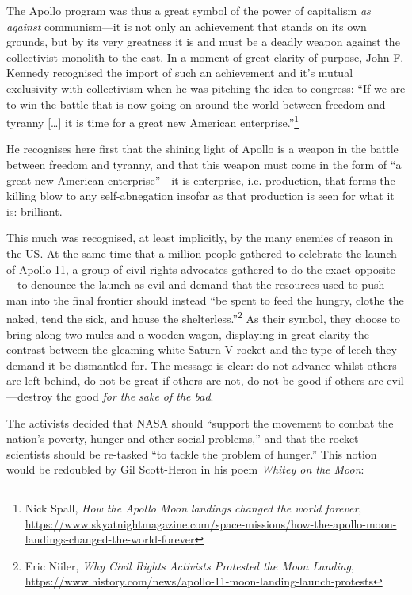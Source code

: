 \documentclass[11pt]{article}
\begin{document}
The Apollo program was thus a great symbol of the power of capitalism \emph{as against} communism---it is not only an achievement that stands on its own grounds, but by its very greatness it is and must be a deadly weapon against the collectivist monolith to the east. In a moment of great clarity of purpose, John F. Kennedy recognised the import of such an achievement and it's mutual exclusivity with collectivism when he was pitching the idea to congress: ``If we are to win the battle that is now going on around the world between freedom and tyranny [\ldots{}] it is time for a great new American enterprise.''\footnote{Nick Spall, \emph{How the Apollo Moon landings changed the world forever}, \url{https://www.skyatnightmagazine.com/space-missions/how-the-apollo-moon-landings-changed-the-world-forever}}

He recognises here first that the shining light of Apollo is a weapon in the battle between freedom and tyranny, and that this weapon must come in the form of ``a great new American enterprise''---it is enterprise, i.e. production, that forms the killing blow to any self-abnegation insofar as that production is seen for what it is: brilliant.

This much was recognised, at least implicitly, by the many enemies of reason in the US. At the same time that a million people gathered to celebrate the launch of Apollo 11, a group of civil rights advocates gathered to do the exact opposite---to denounce the launch as evil and demand that the resources used to push man into the final frontier should instead ``be spent to feed the hungry, clothe the naked, tend the sick, and house the shelterless.''\footnote{Eric Niiler, \emph{Why Civil Rights Activists Protested the Moon Landing}, \url{https://www.history.com/news/apollo-11-moon-landing-launch-protests}} As their symbol, they choose to bring along two mules and a wooden wagon, displaying in great clarity the contrast between the gleaming white Saturn V rocket and the type of leech they demand it be dismantled for. The message is clear: do not advance whilst others are left behind, do not be great if others are not, do not be good if others are evil---destroy the good \emph{for the sake of the bad}.

The activists decided that NASA should ``support the movement to combat the nation's poverty, hunger and other social problems,'' and that the rocket scientists should be re-tasked ``to tackle the problem of hunger.'' This notion would be redoubled by Gil Scott-Heron in his poem \emph{Whitey on the Moon}:
\end{document}
